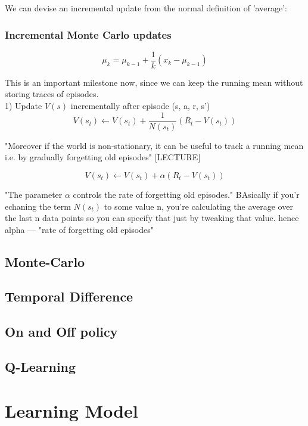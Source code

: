 We can devise an incremental update from the normal definition of 'average':


\subsection{Incremental Monte Carlo updates}

\begin{equation}
    \mu_k = \mu_{k - 1} + \frac{1}{k} (x_k - \mu_{k - 1})
\end{equation}

This is an important milestone now, since we can keep the running mean without storing traces of episodes. \\

1) Update $V(s)$ incrementally after episode (s, a, r, s')\\
\begin{equation}
    V(s_t) \longleftarrow V(s_t) + \frac{1}{N(s_t)}(R_t - V(s_t))
\end{equation}

"Moreover if the world is non-stationary, it can be useful to track a running mean i.e. by gradually forgetting old episodes" [LECTURE]

\begin{equation}
    V(s_t) \longleftarrow V(s_t) + \alpha (R_t - V(s_t))
\end{equation}

"The parameter $\alpha$ controls the rate of forgetting old episodes." BAsically if you'r echaning the term $N(s_t)$ to some value n, you're calculating the average over the last n data points so you can specify that just by tweaking that value. hence alpha — "rate of forgetting old episodes"


\section{Monte-Carlo}
\section{Temporal Difference}
\section{On and Off policy}
\section{Q-Learning}
\chapter{Learning Model}
